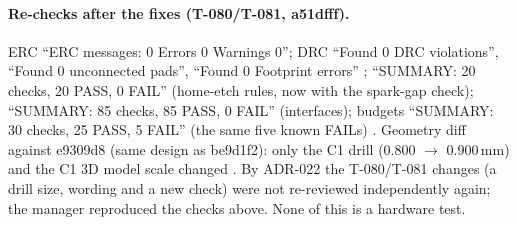 \paragraph{Re-checks after the fixes (T-080/T-081, a51dfff).} ERC ``ERC messages: 0
Errors 0 Warnings 0''; DRC ``Found 0 DRC violations'', ``Found 0 unconnected
pads'', ``Found 0 Footprint errors'' ;
``SUMMARY: 20 checks, 20 PASS, 0 FAIL'' (home-etch rules, now with the spark-gap
check); ``SUMMARY: 85 checks, 85 PASS, 0 FAIL'' (interfaces); budgets ``SUMMARY: 30
checks, 25 PASS, 5 FAIL'' (the same five known FAILs) . Geometry
diff against e9309d8 (same design as be9d1f2): only the C1 drill (0.800 $\rightarrow$ 0.900\,mm) and the C1
3D model scale changed . By
ADR-022 the T-080/T-081 changes (a drill size, wording and a new check) were not
re-reviewed independently again; the manager reproduced the checks above. None of
this is a hardware test.
